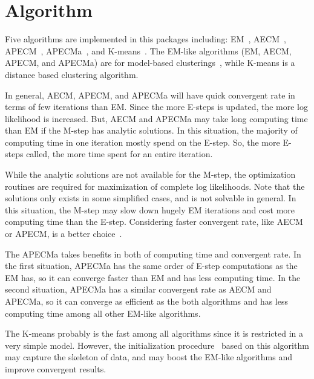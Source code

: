 \section[Algorithm]{Algorithm}
\label{sec:algorithm}

Five algorithms are implemented in this packages including:
EM~\citep{Dempster1977}, AECM~\citep{Meng1997}, APECM~\citep{Chen2011},
APECMa~\citep{Chen2013}, and K-means~\citep{Lloyd1982}.
The EM-like algorithms (EM, AECM, APECM, and APECMa) are for model-based
clusterings~\citep{Fraley2002},
while K-means is a distance based clustering algorithm.

In general, AECM, APECM, and APECMa will have quick convergent rate in terms
of few iterations than EM. Since the more E-steps is updated,
the more log likelihood is increased.
But, AECM and APECMa may take long computing time
than EM if the M-step has analytic solutions. In this situation, the majority
of computing time in one iteration mostly spend on the E-step. So, the more
E-steps called, the more time spent for an entire iteration.

While the analytic solutions are not available for the M-step, the
optimization routines are required for maximization of complete log
likelihoods. Note that the solutions only exists in some simplified cases,
and is not solvable in general.
In this situation, the M-step may slow down hugely
EM iterations and cost more computing time than the E-step.
Considering faster convergent rate, like AECM or APECM,
is a better choice~\citep{Chen2011}.

The APECMa takes benefits in both of computing time and convergent rate.
In the first situation, APECMa has the same order of E-step computations
as the EM has, so it can converge faster than EM and has less computing time.
In the second situation, APECMa has a similar convergent rate as AECM
and APECMa, so it can converge as efficient as the both algorithms and
has less computing time among all other EM-like algorithms.

The K-means probably is the fast among all algorithms since it is restricted
in a very simple model. However, the initialization procedure~\citep{Maitra2009}
based on this algorithm may capture the skeleton of data, and may boost
the EM-like algorithms and improve convergent results.

